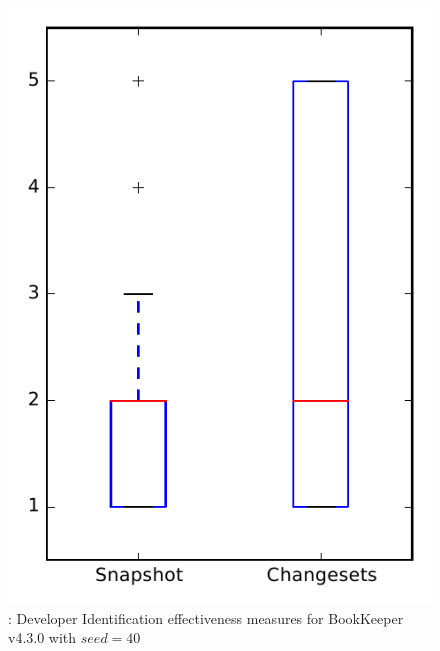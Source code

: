 
\begin{figure}
\centering
\includegraphics[height=0.4\textheight]{figures/dit_seed/rq1_bookkeeper_40}
\caption{\rtwo: Developer Identification effectiveness measures for BookKeeper v4.3.0 with $seed=40$}
\label{fig:dit_seed:rq1:bookkeeper}
\end{figure}
